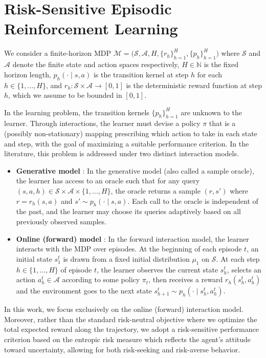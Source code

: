 \documentclass[final,12pt]{colt2026} %
\begin{document}

\section{Risk-Sensitive Episodic Reinforcement Learning}
\label{sec:setting_background}
We consider a finite-horizon MDP $\mathcal{M} = \bigl(\mathcal S, \mathcal A, H, \{r_h\}_{h=1}^H, \{p_h\}_{h=1}^H\bigr)$ where $\mathcal S$ and $\mathcal A$ denote the finite state and action spaces respectively, $H \in \mathbb N$ is the fixed horizon length, $p_h(\cdot \mid s,a)$ is the transition kernel at step $h$ for each $h \in \{1,\dots,H\}$, and $r_h : \mathcal S \times \mathcal A \to [0,1]$ is the deterministic reward function at step $h$, which we assume to be bounded in $[0,1]$.

In the learning problem, the transition kernels $\{p_h\}_{h=1}^H$ are unknown to the learner. Through interactions, the learner must devise a policy $\pi$ that is a (possibly non-stationary) mapping prescribing which action to take in each state and step, with the goal of maximizing a suitable performance criterion. In the literature, this problem is addressed under two distinct interaction models.
\begin{itemize}
    \item \textbf{Generative model} \citep{ICML2012Gheshlaghi_638,KearnsMansourNg2002}: In the generative model (also called a sample oracle), the learner has access to an oracle such that for any query $(s,a,h) \in \mathcal S \times \mathcal A \times \{1,\dots,H\}$, the oracle returns a sample $(r,s')$ where $r = r_h(s,a)$ and $s' \sim p_h(\cdot \mid s,a)$. Each call to the oracle is independent of the past, and the learner may choose its queries adaptively based on all previously observed samples.
    \item \textbf{Online (forward) model} \citep{Dann2015,StrehlLiLittman2009}: In the forward interaction model, the learner interacts with the MDP over episodes. At the beginning of each episode $t$, an initial state $s_1^t$ is drawn from a fixed initial distribution $\mu_1$ on $\mathcal S$. At each step $h \in \{1,\dots,H\}$ of episode $t$, the learner observes the current state $s_h^t$, selects an action $a_h^t \in \mathcal A$ according to some policy $\pi_t$, then receives a reward $r_h(s_h^t,a_h^t)$ and the environment goes to the next state $ s_{h+1}^t \sim p_h(\cdot \mid s_h^t, a_h^t)$.
\end{itemize}
In this work, we focus exclusively on the online (forward) interaction model. Moreover, rather than the standard risk-neutral objective where we optimize the total expected reward along the trajectory, we adopt a risk-sensitive performance criterion based on the entropic risk measure which reflects the agent’s attitude toward uncertainty, allowing for both risk-seeking and risk-averse behavior.
\end{document}
